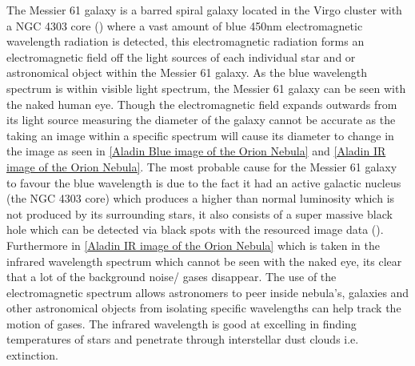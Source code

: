 \documentclass[12pt]{article}
\begin{document}
The Messier 61 galaxy is a barred spiral galaxy located in the Virgo cluster with a NGC 4303 core (\cite{Simbad}) where a vast amount of blue 450nm electromagnetic wavelength radiation is detected, this electromagnetic radiation forms an electromagnetic field off the light sources of each individual star and or astronomical object within the Messier 61 galaxy. As the blue wavelength spectrum is within visible light spectrum, the Messier 61 galaxy can be seen with the naked human eye. Though the electromagnetic field expands outwards from its light source measuring the diameter of the galaxy cannot be accurate as the taking an image within a specific spectrum will cause its diameter to change in the image as seen in \cref{Aladin Blue image of the Orion Nebula} and \cref{Aladin IR image of the Orion Nebula}. The most probable cause for the Messier 61 galaxy to favour the blue wavelength is due to the fact it had an active galactic nucleus (the NGC 4303 core) which produces a higher than normal luminosity which is not produced by its surrounding stars, it also consists of a super massive black hole which can be detected via black spots with the resourced image data (\cite{Diameter}). \\ [0.1cm]
Furthermore in \cref{Aladin IR image of the Orion Nebula} which is taken in the infrared wavelength spectrum which cannot be seen with the naked eye, its clear that a lot of the background noise/ gases disappear. The use of the electromagnetic spectrum allows astronomers to peer inside nebula's, galaxies and other astronomical objects from isolating specific wavelengths can help track the motion of gases. The infrared wavelength is good at excelling in finding temperatures of stars and penetrate through interstellar dust clouds i.e. extinction. 

\printbibliography
\end{document}
